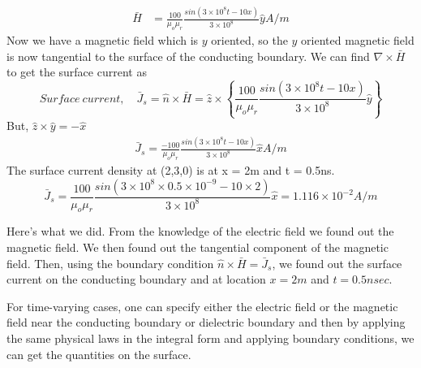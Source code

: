 \begin{exmp}
\begin{align*}
\bar{H} &= \frac{100}{\mu_o\mu_r}\frac{sin(3\times 10^8t -10x)}{3\times 10^8}\hat{y} A/m
\end{align*}
Now we have a magnetic field which is $y$ oriented, so the $y$ oriented magnetic field is now tangential to the surface of the conducting boundary. We can find $\nabla\times\bar{H}$ to get the surface current as
\begin{dmath*}
Surface\ current,\quad \bar{J}_s = \hat{n}\times\bar{H} = \hat{z}\times \left\lbrace \frac{100}{\mu_o\mu_r}\frac{sin(3\times 10^8t -10x)}{3\times 10^8}\hat{y} \right\rbrace  
\end{dmath*}
But, $\hat{z}\times\hat{y} = -\hat{x}$
\begin{align*}
\bar{J}_s = \frac{-100}{\mu_o\mu_r}\frac{sin(3\times 10^8t -10x)}{3\times 10^8}\hat{x} A/m
\end{align*}
The surface current density at (2,3,0) is at x = 2m and t = 0.5ns.
\begin{dmath*}
\bar{J}_s = \frac{100}{\mu_o\mu_r}\frac{sin(3\times 10^8\times 0.5 \times 10^{-9} - 10\times 2)}{3\times 10^8}\hat{x} = 1.116\times 10^{-2} A/m
\end{dmath*}
\end{exmp} 
Here's what we did. From the knowledge of the electric field we found out the magnetic field. We then found out the tangential component of the magnetic field. Then, using the boundary condition $\hat{n}\times\bar{H} = \bar{J}_s$, we found out the surface current on the conducting boundary and at location $x = 2m$ and $t = 0.5nsec$.

For time-varying cases, one can specify either the electric field or the magnetic field near the conducting boundary or dielectric boundary and then by applying the same physical laws in the integral form and applying boundary conditions, we can get the quantities on the surface.

